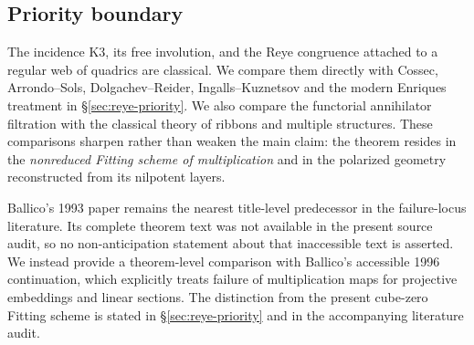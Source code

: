 \subsection*{Priority boundary}

The incidence K3, its free involution, and the Reye congruence attached
to a regular web of quadrics are classical.  We compare them directly
with Cossec, Arrondo--Sols, Dolgachev--Reider, Ingalls--Kuznetsov and
the modern Enriques treatment in
\S\ref{sec:reye-priority}.  We also compare the functorial annihilator
filtration with the classical theory of ribbons and multiple
structures.  These comparisons sharpen rather than weaken the main
claim: the theorem resides in the \emph{nonreduced Fitting scheme of
multiplication} and in the polarized geometry reconstructed from its
nilpotent layers.

Ballico's 1993 paper remains the nearest title-level predecessor in
the failure-locus literature.  Its complete theorem text was not
available in the present source audit, so no non-anticipation statement
about that inaccessible text is asserted.  We instead provide a
theorem-level comparison with Ballico's accessible 1996 continuation,
which explicitly treats failure of multiplication maps for projective
embeddings and linear sections.  The distinction from the present
cube-zero Fitting scheme is stated in
\S\ref{sec:reye-priority} and in the accompanying literature audit.
